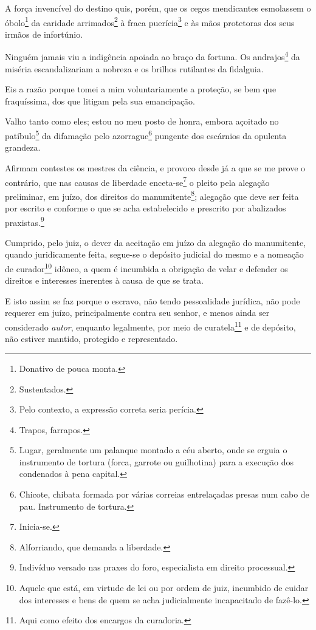 A força invencível do destino quis, porém, que os cegos mendicantes
esmolassem o óbolo\footnote{Donativo de pouca monta.} da caridade
arrimados\footnote{Sustentados.} à fraca puerícia\footnote{Pelo
  contexto, a expressão correta seria perícia.} e às mãos protetoras dos
seus irmãos de infortúnio.

Ninguém jamais viu a indigência apoiada ao braço da fortuna. Os
andrajos\footnote{Trapos, farrapos.} da miséria escandalizariam a
nobreza e os brilhos rutilantes da fidalguia.

Eis a razão porque tomei a mim voluntariamente a proteção, se bem que
fraquíssima, dos que litigam pela sua emancipação.

Valho tanto como eles; estou no meu posto de honra, embora açoitado no
patíbulo\footnote{Lugar, geralmente um palanque montado a céu aberto,
  onde se erguia o instrumento de tortura (forca, garrote ou guilhotina)
  para a execução dos condenados à pena capital.} da difamação pelo
azorrague\footnote{Chicote, chibata formada por várias correias
  entrelaçadas presas num cabo de pau. Instrumento de tortura.} pungente
dos escárnios da opulenta grandeza.



Afirmam contestes os mestres da ciência, e provoco desde já a que se me
prove o contrário, que nas causas de liberdade enceta-se\footnote{
  Inicia-se.} o pleito pela alegação preliminar, em juízo, dos direitos
do manumitente\footnote{Alforriando, que demanda a liberdade.};
alegação que deve ser feita por escrito e conforme o que se acha
estabelecido e prescrito por abalizados praxistas.\footnote{Indivíduo
  versado nas praxes do foro, especialista em direito processual.}

Cumprido, pelo juiz, o dever da aceitação em juízo da alegação do
manumitente, quando juridicamente feita, segue-se o depósito judicial do
mesmo e a nomeação de curador\footnote{Aquele que está, em virtude de
  lei ou por ordem de juiz, incumbido de cuidar dos interesses e bens de
  quem se acha judicialmente incapacitado de fazê-lo.} idôneo, a quem é
incumbida a obrigação de velar e defender os direitos e interesses
inerentes à causa de que se trata.

E isto assim se faz porque o escravo, não tendo pessoalidade jurídica,
não pode requerer em juízo, principalmente contra seu senhor, e menos
ainda ser considerado \emph{autor}, enquanto legalmente, por meio de
curatela\footnote{Aqui como efeito dos encargos da curadoria.} e de
depósito, não estiver mantido, protegido e representado.

